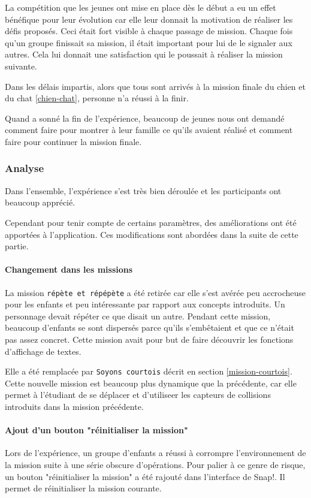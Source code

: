 La compétition que les jeunes ont mise en place dès le début a eu un effet bénéfique pour leur évolution car elle leur donnait la motivation de réaliser les défis proposés. Ceci était fort visible à chaque passage de mission. Chaque fois qu'un groupe finissait sa mission, il était important pour lui de le signaler aux autres. Cela lui donnait une satisfaction qui le poussait à réaliser la mission suivante. 

Dans les délais impartis, alors que tous sont arrivés à la mission finale du chien et du chat \ref{chien-chat}, personne n'a réussi à la finir. 

Quand a sonné la fin de l'expérience, beaucoup de jeunes nous ont demandé comment faire pour montrer à leur famille ce qu'ils avaient réalisé et comment faire pour continuer la mission finale.

\subsubsection{Analyse}
\label{analyse-kidscode}
Dans l'ensemble, l'expérience s'est très bien déroulée et les participants ont beaucoup apprécié.

Cependant pour tenir compte de certains paramètres, des améliorations ont été apportées à l'application. Ces modifications sont abordées dans la suite de cette partie.

\paragraph{Changement dans les missions}
La mission \texttt{répète et répépète} a été retirée car elle s'est avérée peu accrocheuse pour les enfants et peu intéressante par rapport aux concepts introduits. Un personnage devait répéter ce que disait un autre. Pendant cette mission, beaucoup d'enfants se sont dispersés parce qu'ils s'embêtaient et que ce n'était pas assez concret. Cette mission avait pour but de faire découvrir les fonctions d'affichage de textes. 

Elle a été remplacée par \texttt{Soyons courtois} décrit en section \ref{mission-courtois}. Cette nouvelle mission est beaucoup plus dynamique que la précédente, car elle permet à l'étudiant de se déplacer et d'utiliseer les capteurs de collisions introduits dans la mission précédente.

\paragraph{Ajout d'un bouton "réinitialiser la mission"}
Lors de l'expérience, un groupe d'enfants a réussi à corrompre l'environnement de la mission suite à une série obscure d'opérations. Pour palier à ce genre de risque, un bouton "réinitialiser la mission" a été rajouté dans l'interface de Snap!. Il permet de réinitialiser la mission courante.

